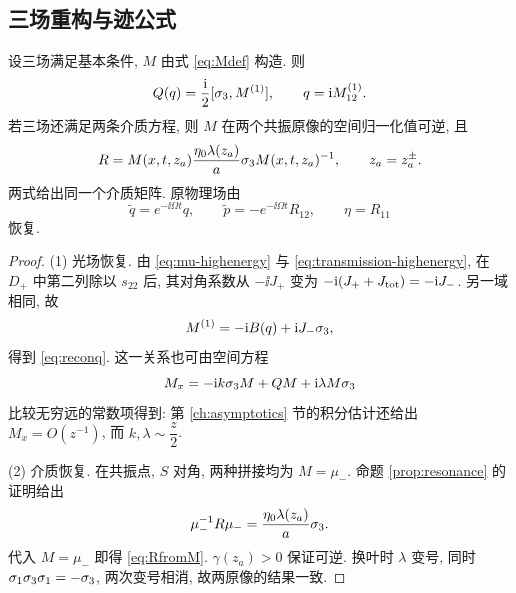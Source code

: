 \subsection{三场重构与迹公式}
\begin{proposition}\label{prop:reconstruction}
设三场满足基本条件, $M$ 由式 \eqref{eq:Mdef} 构造. 则
\begin{equation}\label{eq:reconq}
Q(q)=\dfrac{\mathrm{i}}{2}[\sigma_3,M^{(1)}],\qquad q=\mathrm{i} M^{(1)}_{12}.
\end{equation}
若三场还满足两条介质方程, 则 $M$ 在两个共振原像的空间归一化值可逆, 且
\begin{equation}\label{eq:RfromM}
R=M(x,t,z_a)\dfrac{\eta_0\lambda(z_a)}{a}\sigma_3 M(x,t,z_a)^{-1},
\qquad z_a=z_a^\pm.
\end{equation}
两式给出同一个介质矩阵. 原物理场由
\begin{equation}\label{eq:original-fields}
\widetilde q=e^{-\ii\Omega t}q,\qquad
\widetilde p=-e^{-\ii\Omega t}R_{12},\qquad \eta=R_{11}
\end{equation}
恢复.
\end{proposition}
\begin{proof}
(1) 光场恢复. 由 \eqref{eq:mu-highenergy} 与 \eqref{eq:transmission-highenergy}, 在 $D_+$ 中第二列除以 $s_{22}$ 后, 其对角系数从 $-\ii J_+$ 变为 $-\mathrm{i}(J_++J_{\rm tot})=-\mathrm{i} J_-$. 另一域相同, 故
\begin{equation*}
M^{(1)}=-\mathrm{i} B(q)+\mathrm{i} J_-\sigma_3,
\end{equation*}
得到 \eqref{eq:reconq}. 这一关系也可由空间方程
\begin{equation}\label{eq:Mspace}
M_x=-\mathrm{i} k\sigma_3 M+QM+\mathrm{i}\lambda M\sigma_3
\end{equation}
比较无穷远的常数项得到: 第 \ref{ch:asymptotics} 节的积分估计还给出 $M_x=O(z^{-1})$, 而 $k,\lambda\sim\dfrac{z}{2}$.

(2) 介质恢复. 在共振点, $S$ 对角, 两种拼接均为 $M=\mu_-$. 命题 \ref{prop:resonance} 的证明给出
\begin{equation*}
\mu_-^{-1}R\mu_-=\dfrac{\eta_0\lambda(z_a)}{a}\sigma_3.
\end{equation*}
代入 $M=\mu_-$ 即得 \eqref{eq:RfromM}. $\gamma(z_a)>0$ 保证可逆. 换叶时 $\lambda$ 变号, 同时 $\sigma_1\sigma_3\sigma_1=-\sigma_3$, 两次变号相消, 故两原像的结果一致.
\end{proof}


